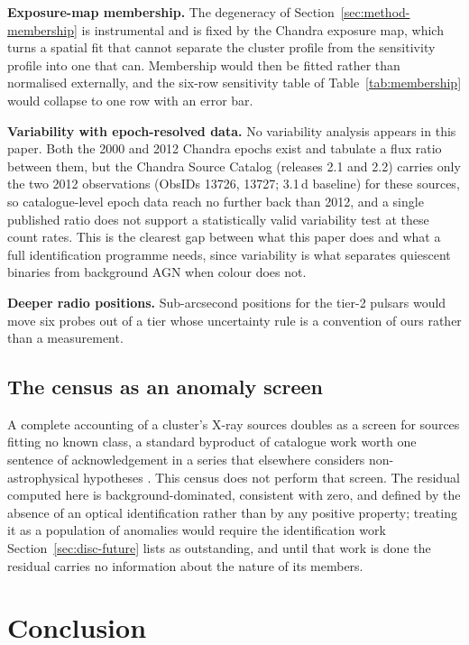\documentclass[11pt]{article}
\begin{document}
\textbf{Exposure-map membership.} The degeneracy of Section~\ref{sec:method-membership} is instrumental and is fixed by the Chandra exposure map, which turns a spatial fit that cannot separate the cluster profile from the sensitivity profile into one that can. Membership would then be fitted rather than normalised externally, and the six-row sensitivity table of Table~\ref{tab:membership} would collapse to one row with an error bar.

\textbf{Variability with epoch-resolved data.} No variability analysis appears in this paper. Both the 2000 and 2012 Chandra epochs exist and \citet{Henleywillis2018} tabulate a flux ratio between them, but the Chandra Source Catalog (releases 2.1 and 2.2) carries only the two 2012 observations (ObsIDs 13726, 13727; 3.1\,d baseline) for these sources, so catalogue-level epoch data reach no further back than 2012, and a single published ratio does not support a statistically valid variability test at these count rates. This is the clearest gap between what this paper does and what a full identification programme needs, since variability is what separates quiescent binaries from background AGN when colour does not.

\textbf{Deeper radio positions.} Sub-arcsecond positions for the tier-2 pulsars would move six probes out of a tier whose uncertainty rule is a convention of ours rather than a measurement.

\subsection{The census as an anomaly screen}
\label{sec:disc-anomaly}

A complete accounting of a cluster's X-ray sources doubles as a screen for sources fitting no known class, a standard byproduct of catalogue work worth one sentence of acknowledgement in a series that elsewhere considers non-astrophysical hypotheses \citep{Swanson2026Engineered}. This census does not perform that screen. The residual computed here is background-dominated, consistent with zero, and defined by the absence of an optical identification rather than by any positive property; treating it as a population of anomalies would require the identification work Section~\ref{sec:disc-future} lists as outstanding, and until that work is done the residual carries no information about the nature of its members.

\section{Conclusion}
\label{sec:conclusion}
\end{document}
